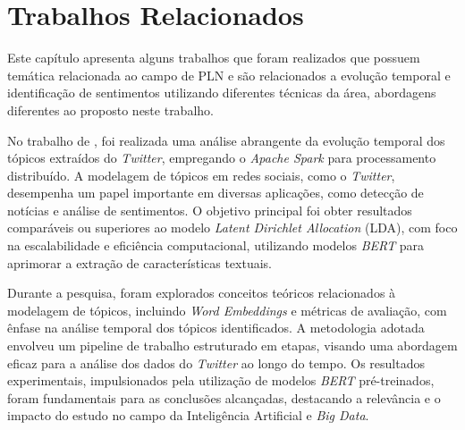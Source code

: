 \chapter{Trabalhos Relacionados}
\label{cap:trabalhos_relacionados}

Este capítulo apresenta alguns trabalhos que foram realizados que possuem temática relacionada ao campo de PLN e são relacionados a evolução temporal e identificação de sentimentos utilizando diferentes técnicas da área, abordagens diferentes ao proposto neste trabalho.


No trabalho de , foi realizada uma análise abrangente da evolução temporal dos tópicos extraídos do \textit{Twitter}, empregando o \textit{Apache Spark} para processamento distribuído. A modelagem de tópicos em redes sociais, como o \textit{Twitter}, desempenha um papel importante em diversas aplicações, como detecção de notícias e análise de sentimentos. O objetivo principal foi obter resultados comparáveis ou superiores ao modelo \textit{Latent Dirichlet Allocation} (LDA), com foco na escalabilidade e eficiência computacional, utilizando modelos \textit{BERT} para aprimorar a extração de características textuais.

Durante a pesquisa, foram explorados conceitos teóricos relacionados à modelagem de tópicos, incluindo \textit{Word Embeddings} e métricas de avaliação, com ênfase na análise temporal dos tópicos identificados. A metodologia adotada envolveu um pipeline de trabalho estruturado em etapas, visando uma abordagem eficaz para a análise dos dados do \textit{Twitter} ao longo do tempo. Os resultados experimentais, impulsionados pela utilização de modelos \textit{BERT} pré-treinados, foram fundamentais para as conclusões alcançadas, destacando a relevância e o impacto do estudo no campo da Inteligência Artificial e \textit{Big Data}.



